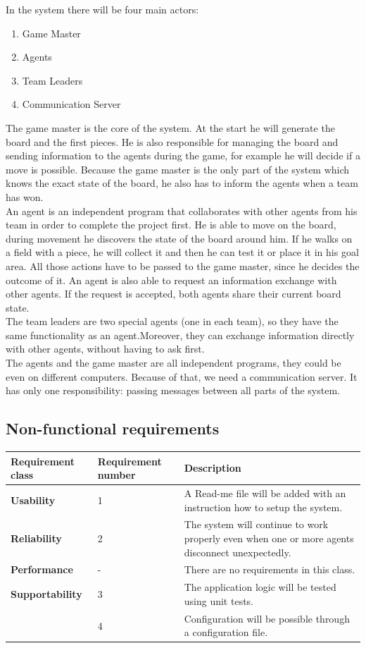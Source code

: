 \documentclass[11pt,a4paper]{article}
\begin{document}
In the system there will be four main actors:
\begin{enumerate}
\item Game Master
\item Agents
\item Team Leaders
\item Communication Server
\end{enumerate}
The game master is the core of the system. At the start he will generate the board and the first pieces. He is also responsible for managing the board and sending information to the agents during the game, for example he will decide if a move is possible. Because the game master is the only part of the system which knows the exact state of the board, he also has to inform the agents when a team has won. \\
An agent is an independent program that collaborates with other agents from his team in order to complete the project first. He is able to move on the board, during movement he discovers the state of the board around him. If he walks on a field with a piece, he will collect it and then he can test it or place it in his goal area. All those actions have to be passed to the game master, since he decides the outcome of it.  An agent is also able to request an information exchange with other agents. If the request is accepted, both agents share their current board state.\\
The team leaders are two special agents (one in each team), so they have the same functionality as an agent.Moreover, they can exchange information directly with other agents, without having to ask first. \\
The agents and the game master are all independent programs, they could be even on different computers. Because of that, we need a communication server. It has only one responsibility: passing messages between all parts of the system.
\subsection{Non-functional requirements}

\begin{longtable}{| p{3.5cm} | l | p{5.5cm} |}
\hline
\textbf{Requirement class} & Requirement number & Description \\ \hline
\textbf{Usability} & 1 & A Read-me file will be added with an instruction how to setup the system. \\ \hline
\textbf{Reliability} & 2 & The system will continue to work properly even when one or more agents disconnect unexpectedly. \\ \hline
\textbf{Performance} & - & There are no requirements in this class. \\ \hline
\textbf{Supportability} & 3 & The application logic will be tested using unit tests.\\ \cline{2-3}
 & 4 & Configuration will be possible through a configuration file.\\ \hline
\end{longtable}
\end{document}
